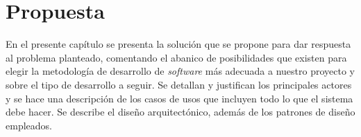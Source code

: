 \chapter{Propuesta}\label{chapter:proposal}

En el presente capítulo se presenta la solución que se propone para dar respuesta al problema planteado, comentando el abanico de posibilidades que existen para elegir la metodología de desarrollo de \textit{software} más adecuada a nuestro proyecto y sobre el tipo de desarrollo a seguir. Se detallan y justifican los principales actores y se hace una descripción de los casos de usos que incluyen todo lo que el sistema debe hacer. Se describe el diseño arquitectónico, además de los patrones de diseño empleados.

%
%
%

